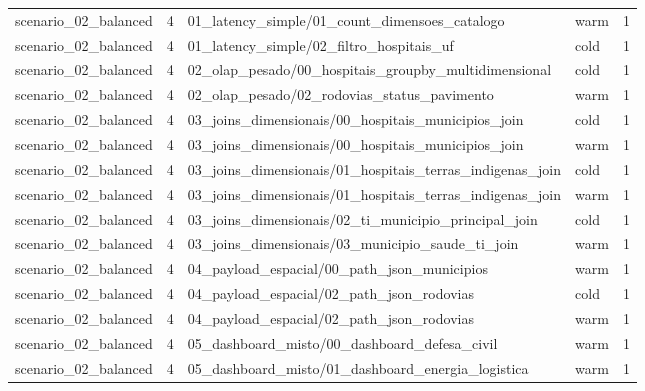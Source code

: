 {\begin{longtable}{p{}p{}p{}p{}p{}}
scenario\_02\_balanced & 4 & 01\_latency\_simple/01\_count\_dimensoes\_catalogo & warm & 1 \\
scenario\_02\_balanced & 4 & 01\_latency\_simple/02\_filtro\_hospitais\_uf & cold & 1 \\
scenario\_02\_balanced & 4 & 02\_olap\_pesado/00\_hospitais\_groupby\_multidimensional & cold & 1 \\
scenario\_02\_balanced & 4 & 02\_olap\_pesado/02\_rodovias\_status\_pavimento & warm & 1 \\
scenario\_02\_balanced & 4 & 03\_joins\_dimensionais/00\_hospitais\_municipios\_join & cold & 1 \\
scenario\_02\_balanced & 4 & 03\_joins\_dimensionais/00\_hospitais\_municipios\_join & warm & 1 \\
scenario\_02\_balanced & 4 & 03\_joins\_dimensionais/01\_hospitais\_terras\_indigenas\_join & cold & 1 \\
scenario\_02\_balanced & 4 & 03\_joins\_dimensionais/01\_hospitais\_terras\_indigenas\_join & warm & 1 \\
scenario\_02\_balanced & 4 & 03\_joins\_dimensionais/02\_ti\_municipio\_principal\_join & cold & 1 \\
scenario\_02\_balanced & 4 & 03\_joins\_dimensionais/03\_municipio\_saude\_ti\_join & warm & 1 \\
scenario\_02\_balanced & 4 & 04\_payload\_espacial/00\_path\_json\_municipios & warm & 1 \\
scenario\_02\_balanced & 4 & 04\_payload\_espacial/02\_path\_json\_rodovias & cold & 1 \\
scenario\_02\_balanced & 4 & 04\_payload\_espacial/02\_path\_json\_rodovias & warm & 1 \\
scenario\_02\_balanced & 4 & 05\_dashboard\_misto/00\_dashboard\_defesa\_civil & warm & 1 \\
scenario\_02\_balanced & 4 & 05\_dashboard\_misto/01\_dashboard\_energia\_logistica & warm & 1 \\
\bottomrule
\end{longtable}
}
